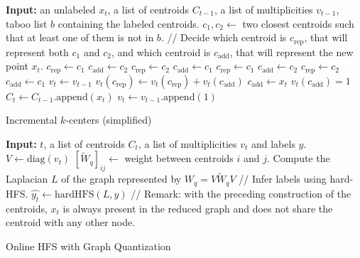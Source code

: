 \documentclass{article}
\begin{document}
\begin{algorithm}[H]
	\begin{algorithmic}[1]
		{\small
			\STATE  \textbf{Input:} an unlabeled $x_t$, a list of centroids $C_{t - 1}$, a list of multiplicities $v_{t-1}$, taboo list $b$ containing the labeled centroids.
				\STATE $c_1, c_2 \gets $ two closest centroids such that at least one of them is not in $b$.
				\STATE // Decide which centroid is $c_{\mathrm{rep}}$, that will represent both $c_1$ and $c_2$, and which centroid is $c_{\mathrm{add}}$, that will represent the new point $x_t$.
					\STATE $c_{\mathrm{rep}} \gets c_1$
					\STATE $c_{\mathrm{add}} \gets c_2$
					\STATE $c_{\mathrm{rep}} \gets c_2$
					\STATE $c_{\mathrm{add}} \gets c_1$
					\STATE $c_{\mathrm{rep}} \gets c_1$
					\STATE $c_{\mathrm{add}} \gets c_2$ 
				\ELSE 
					\STATE $c_{\mathrm{rep}} \gets c_2$
					\STATE $c_{\mathrm{add}} \gets c_1$
				\ENDIF  
				\STATE $v_t \gets v_{t-1}$
				\STATE $v_t(c_{\mathrm{rep}}) \gets v_t(c_{\mathrm{rep}}) + v_t(c_{\mathrm{add}})$
				\STATE $c_{\mathrm{add}} \gets x_t$
				\STATE $v_t(c_{\mathrm{add}}) = 1$
			\ELSE
				\STATE  $C_t \gets C_{t - 1}.\mathrm{append}(x_t)$
				\STATE  $v_t \gets v_{t-1}.\mathrm{append}(1)$
			\ENDIF
		}
	\end{algorithmic}
	\caption{Incremental $k$-centers (simplified)}\label{alg:inc_k_centers}
\end{algorithm}

\begin{algorithm}[H]
	\begin{algorithmic}[1]
		\STATE  \textbf{Input:} $t$, a list of centroids $C_t$, a list of multiplicities $v_t$ and labels $y$.
		\STATE $V \gets \mathrm{diag}(v_t)$
		\STATE $[\widetilde{W}_q]_{ij} \gets$ weight between centroids $i$ and $j$. 
		\STATE Compute the Laplacian $L$ of the graph represented by $W_q = V\widetilde{W}_qV$
		\STATE  // Infer labels using hard-HFS.
		\STATE $\widehat{y_t} \gets \mathrm{hardHFS}(L, y)$
		\STATE // Remark: with the preceding construction of the centroids, $x_t$ is always present in the reduced graph and does not share the centroid with any other node.
	\end{algorithmic}
	\caption{Online HFS with Graph Quantization}\label{alg:quant_shfs}
\end{algorithm}
\end{document}
